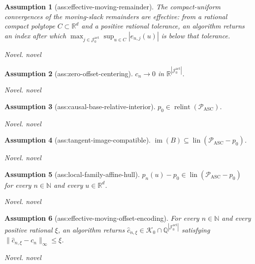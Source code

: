 \documentclass{article}
\newtheorem{assumption}{Assumption}
\begin{document}
\begin{assumption}[ass:effective-moving-remainder]\label{ass:effective-moving-remainder}
The compact-uniform convergences of the moving-slack remainders are effective: from a rational compact polytope \(C\subset\mathbb R^d\) and a positive rational tolerance, an algorithm returns an index after which \(\max_{j\in\mathcal J_0^{\mathrm{act}}}\sup_{u\in C}|e_{n,j}(u)|\) is below that tolerance.
\par\smallskip\noindent\emph{Novel.} novel
\end{assumption}

\begin{assumption}[ass:zero-offset-centering]\label{ass:zero-offset-centering}
\(c_n\to0\) in \(\mathbb R^{|\mathcal J_0^{\mathrm{act}}|}\).
\par\smallskip\noindent\emph{Novel.} novel
\end{assumption}

\begin{assumption}[ass:causal-base-relative-interior]\label{ass:causal-base-relative-interior}
\(p_0\in\operatorname{relint}(\mathcal P_{\mathrm{ASC}})\).
\par\smallskip\noindent\emph{Novel.} novel
\end{assumption}

\begin{assumption}[ass:tangent-image-compatible]\label{ass:tangent-image-compatible}
\(\operatorname{im}(B)\subseteq\operatorname{lin}(\mathcal P_{\mathrm{ASC}}-p_0)\).
\par\smallskip\noindent\emph{Novel.} novel
\end{assumption}

\begin{assumption}[ass:local-family-affine-hull]\label{ass:local-family-affine-hull}
\(p_n(u)-p_0\in\operatorname{lin}(\mathcal P_{\mathrm{ASC}}-p_0)\) for every \(n\in\mathbb N\) and every \(u\in\mathbb R^d\).
\par\smallskip\noindent\emph{Novel.} novel
\end{assumption}

\begin{assumption}[ass:effective-moving-offset-encoding]\label{ass:effective-moving-offset-encoding}
For every \(n\in\mathbb N\) and every positive rational \(\xi\), an algorithm returns \(\widehat c_{n,\xi}\in\mathcal K_0\cap\mathbb Q^{|\mathcal J_0^{\mathrm{act}}|}\) satisfying \(\|\widehat c_{n,\xi}-c_n\|_\infty\le\xi\).
\par\smallskip\noindent\emph{Novel.} novel
\end{assumption}
\end{document}
